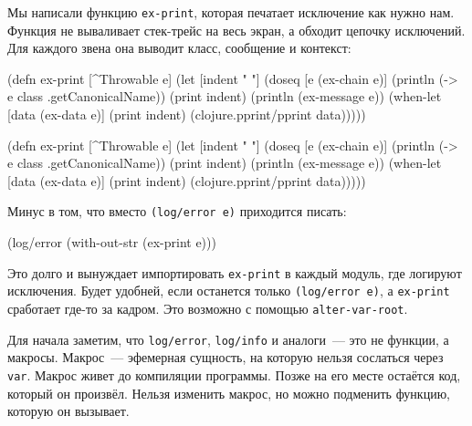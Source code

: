 Мы написали функцию \verb|ex-print|, которая печатает исключение как нужно
нам. Функция не вываливает стек-трейс на весь экран, а обходит цепочку
исключений. Для каждого звена она выводит класс, сообщение и контекст:

\ifnarrow

\begin{english}
  \begin{clojure}
(defn ex-print
  [^Throwable e]
  (let [indent "  "]
    (doseq [e (ex-chain e)]
      (println (-> e
                   class
                   .getCanonicalName))
      (print indent)
      (println (ex-message e))
      (when-let [data (ex-data e)]
        (print indent)
        (clojure.pprint/pprint data)))))
  \end{clojure}
\end{english}

\else

\begin{english}
  \begin{clojure}
(defn ex-print
  [^Throwable e]
  (let [indent "  "]
    (doseq [e (ex-chain e)]
      (println (-> e class .getCanonicalName))
      (print indent)
      (println (ex-message e))
      (when-let [data (ex-data e)]
        (print indent)
        (clojure.pprint/pprint data)))))
  \end{clojure}
\end{english}

\fi

\noindent
Минус в том, что вместо \verb|(log/error e)| приходится писать:

\begin{english}
  \begin{clojure}
(log/error (with-out-str (ex-print e)))
  \end{clojure}
\end{english}

Это долго и вынуждает импортировать \texttt{ex-\-print} в каждый модуль, где логируют
исключения. Будет удобней, если останется только \verb|(log/error e)|, а
\verb|ex-print| сработает где-то за кадром. Это возможно с помощью
\texttt{alter-var\--root}.

Для начала заметим, что \verb|log/error|, \verb|log/info| и аналоги~--- это не
функции, а макросы. Макрос~--- эфемерная сущность, на которую нельзя сослаться
через \verb|var|. Макрос живет до компиляции программы. Позже на его месте
остаётся код, который он произвёл. Нельзя изменить макрос, но можно подменить
функцию, которую он вызывает.


